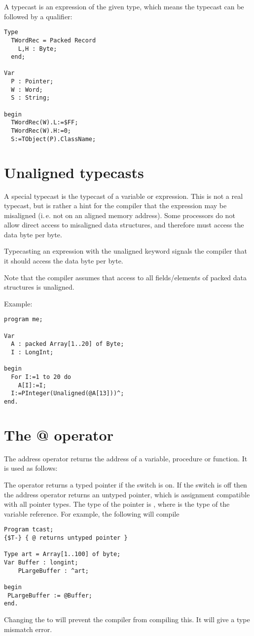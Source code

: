 A typecast is an expression of the given type, which means the
typecast can be followed by a qualifier:
\begin{verbatim}
Type
  TWordRec = Packed Record
    L,H : Byte;
  end;

Var
  P : Pointer;
  W : Word;
  S : String;

begin
  TWordRec(W).L:=$FF;
  TWordRec(W).H:=0;
  S:=TObject(P).ClassName;
\end{verbatim}

\section{Unaligned typecasts}
A special typecast is the  typecast of a variable or
expression. This is not a real typecast, but is rather a hint for the
compiler that the expression may be misaligned (i.\,e. not on an aligned
memory address). Some processors do not allow direct access to misaligned
data structures, and therefore must access the data byte per byte.

Typecasting an expression with the unaligned keyword signals the compiler
that it should access the data byte per byte.

Note that the compiler assumes that access to all fields/elements of
packed data structures is unaligned.

Example:
\begin{verbatim}
program me;

Var
  A : packed Array[1..20] of Byte;
  I : LongInt;

begin
  For I:=1 to 20 do
    A[I]:=I;
  I:=PInteger(Unaligned(@A[13]))^;
end.
\end{verbatim}

\section{The @ operator}

The address operator  returns the address of a variable, procedure
or function. It is used as follows:

The  operator returns a typed pointer if the  switch is on.
If the  switch is off then the address operator returns an untyped
pointer, which is assignment compatible with all pointer types. The type of
the pointer is , where  is the type of the variable
reference.
For example, the following will compile
\begin{verbatim}
Program tcast;
{$T-} { @ returns untyped pointer }

Type art = Array[1..100] of byte;
Var Buffer : longint;
    PLargeBuffer : ^art;

begin
 PLargeBuffer := @Buffer;
end.
\end{verbatim}
Changing the  to  will prevent the compiler from
compiling this. It will give a type mismatch error.

